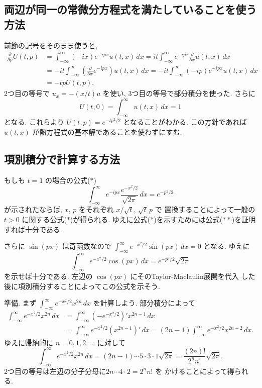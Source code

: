 \documentclass[12pt,twoside]{jarticle}
\renewcommand\d{\partial}
\theoremstyle{jplain}
\theoremstyle{jplain}
\theoremstyle{jplain}
\numberwithin{theorem}{section}
\numberwithin{equation}{section}
\numberwithin{figure}{section}
\numberwithin{table}{section}
\begin{document}

\subsection{両辺が同一の常微分方程式を満たしていることを使う方法}

前節の記号をそのまま使うと,  
\begin{align*}
\frac{\d}{\d p}U(t,p)
&=\int_{-\infty}^\infty (-ix)e^{-ipx}u(t,x)\,dx
=it\int_{-\infty}^\infty e^{-ipx}\frac{\d}{\d x}u(t,x)\,dx
\\ &
=-it\int_{-\infty}^\infty \left(\frac{\d}{\d x}e^{-ipx}\right)u(t,x)\,dx
=-it\int_{-\infty}^\infty (-ip)e^{-ipx}u(t,x)\,dx
\\ &
=-tp U(t,p).
\end{align*}
2つ目の等号で $u_x=-(x/t)u$ を使い, 
3つ目の等号で部分積分を使った.
さらに
\[
U(t,0)=\int_{-\infty}^\infty u(t,x)\,dx=1
\]
となる. これらより $U(t,p)=e^{-tp^2/2}$ となることがわかる.
この方針であれば $u(t,x)$ が熱方程式の基本解であることを使わずにすむ.


\subsection{項別積分で計算する方法}

もしも $t=1$ の場合の公式($*$)
\[
\int_{-\infty}^\infty e^{-ipx} \frac{e^{-x^2/2}}{\sqrt{2\pi}}\,dx = e^{-p^2/2}
\tag{$**$}
\]
が示されたならば, 
$x$, $p$ をそれぞれ $x/\sqrt{t}$, $\sqrt{t}\,p$ で
置換することによって一般の $t>0$ に関する公式($*$)が得られる. 
ゆえに公式($*$)を示すためには公式($**$)を証明すれば十分である.

さらに $\sin(px)$ は奇函数なので 
$\int_{-\infty}^\infty e^{-x^2/2} \sin(px)\,dx=0$ となる.
ゆえに
\[
\int_{-\infty}^\infty e^{-x^2/2}\cos(px)\,dx=e^{-p^2/2}\sqrt{2\pi}
\]
を示せば十分である. 左辺の $\cos(px)$ にそのTaylor-Maclaulin展開を代入
した後に項別積分することによってこの公式を示そう.

準備. まず $\int_{-\infty}^\infty e^{-x^2/2}x^{2n}\,dx$ を計算しよう.
部分積分によって
\begin{align*}
\int_{-\infty}^\infty e^{-x^2/2} x^{2n}\,dx
&=
\int_{-\infty}^\infty \left(-e^{-x^2/2}\right)' x^{2n-1}\,dx
\\ &
=\int_{-\infty}^\infty e^{-x^2/2} (x^{2n-1})'\,dx
=(2n-1)\int_{-\infty}^\infty e^{-x^2/2} x^{2n-2}\,dx.
\end{align*}
ゆえに帰納的に $n=0,1,2,\ldots$ に対して
\[
\int_{-\infty}^\infty e^{-x^2/2} x^{2n}\,dx
=(2n-1)\cdots 5\cdot 3\cdot 1\sqrt{2\pi}
=\frac{(2n)!}{2^n n!}\sqrt{2\pi}.
\]
2つ目の等号は左辺の分子分母に$2n\cdots 4\cdot 2=2^n n!$ を
かけることによって得られる.
\end{document}
